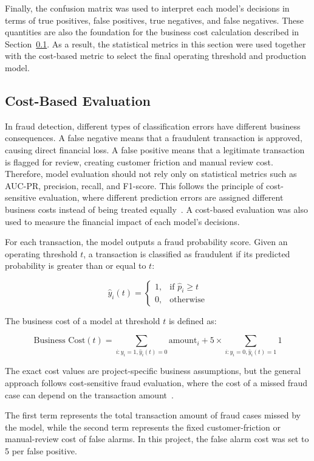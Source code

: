 Finally, the confusion matrix was used to interpret each model's decisions in terms of true positives, false positives, true negatives, and false negatives. These quantities are also the foundation for the business cost calculation described in Section~\ref{sec:cost_based_evaluation}. As a result, the statistical metrics in this section were used together with the cost-based metric to select the final operating threshold and production model.

\subsection{Cost-Based Evaluation}
\label{sec:cost_based_evaluation}

In fraud detection, different types of classification errors have different business consequences. A false negative means that a fraudulent transaction is approved, causing direct financial loss. A false positive means that a legitimate transaction is flagged for review, creating customer friction and manual review cost. Therefore, model evaluation should not rely only on statistical metrics such as AUC-PR, precision, recall, and F1-score. This follows the principle of cost-sensitive evaluation, where different prediction errors are assigned different business costs instead of being treated equally~\cite{elkan2001foundations}. A cost-based evaluation was also used to measure the financial impact of each model's decisions.

For each transaction, the model outputs a fraud probability score. Given an operating threshold $t$, a transaction is classified as fraudulent if its predicted probability is greater than or equal to $t$:

\[
\hat{y}_i(t) =
\begin{cases}
1, & \text{if } \hat{p}_i \geq t \\
0, & \text{otherwise}
\end{cases}
\]

The business cost of a model at threshold $t$ is defined as:

\[
\text{Business Cost}(t)
=
\sum_{i: y_i = 1, \hat{y}_i(t) = 0} \text{amount}_i
+
5 \times \sum_{i: y_i = 0, \hat{y}_i(t) = 1} 1
\]

The exact cost values are project-specific business assumptions, but the general approach follows cost-sensitive fraud evaluation, where the cost of a missed fraud case can depend on the transaction amount~\cite{bahnsen2015example}.

The first term represents the total transaction amount of fraud cases missed by the model, while the second term represents the fixed customer-friction or manual-review cost of false alarms. In this project, the false alarm cost was set to 5 per false positive.

